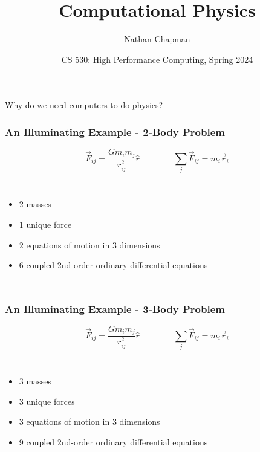 \documentclass{beamer}
\title[Computational Physics]{Computational Physics}
\author[Chapman, Nathan]{Nathan Chapman}
\institute[CWU]
{
  Faculty of Physics\\
  Central Washington University
}
\date[HPC 2024]{CS 530: High Performance Computing, Spring 2024}
\begin{document}
\frame{\titlepage}

\begin{frame}

    \begin{block}{}
        \centering \Large Why do we need computers to do physics?
    \end{block}

\end{frame}

\begin{frame}
    \frametitle{An Illuminating Example - 2-Body Problem}
    \vspace{-0.75in}
    \begin{equation}
        \vec{F}_{ij} = \frac{G m_i m_j}{r_{ij}^2} \hat{r} \qquad \qquad \sum_j \vec{F}_{ij} = m_i \ddot{\vec{r}}_i
    \end{equation}

    \begin{columns}
        \begin{itemize}
            \item 2 masses
            \item 1 unique force
            \item 2 equations of motion in 3 dimensions
            \item 6 coupled 2nd-order ordinary differential equations
        \end{itemize}

    \end{columns}
\end{frame}

\begin{frame}
    \frametitle{An Illuminating Example - 3-Body Problem}
    \vspace{-0.75in}
    \begin{equation}
        \vec{F}_{ij} = \frac{G m_i m_j}{r_{ij}^2} \hat{r} \qquad \qquad \sum_j \vec{F}_{ij} = m_i \ddot{\vec{r}}_i 
    \end{equation}

    \begin{columns}
        \begin{itemize}
            \item 3 masses
            \item 3 unique forces
            \item 3 equations of motion in 3 dimensions
            \item 9 coupled 2nd-order ordinary differential equations
        \end{itemize}

    \end{columns}
\end{frame}
\end{document}
